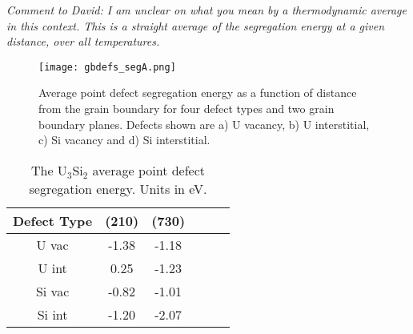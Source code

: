 \documentclass[review]{elsarticle}
\begin{document}
\begin{comment}

\begin{figure}[h]
 \centering
 \texttt{[image: defectsB730.png]} 
 \caption{Point defect segregation energy as a function of distance from the (730) symmetric tilt grain boundary. Each defect is investigated at four different temperatures. Defects shown are a) U vacancy, b) U interstitial, c) Si vacancy and d) Si interstitial. }
 \label{fig:defects730}
\end{figure}

\begin{figure}[h]
 \centering
 \texttt{[image: defectsB210.png]} 
 \caption{Point defect segregation energy as a function of distance from the grain boundary. Each defect is investigated at four different temperatures. Defects shown are U vacancy, U interstitial, Si vacancy and Si interstitial. }
 \label{fig:defects210}
\end{figure}

\end{comment}

\textit{\color{blue}Comment to David: I am unclear on what you mean by a thermodynamic average in this context. This is a straight average of the segregation energy at a given distance, over all temperatures.} 

\begin{figure}[h]
 \centering
 \texttt{[image: gbdefs\_segA.png]} 
 \caption{Average point defect segregation energy as a function of distance from the grain boundary for four defect types and two grain boundary planes. Defects shown are a) U vacancy, b) U interstitial, c) Si vacancy and d) Si interstitial. }
 \label{fig:seg}
\end{figure}

\FloatBarrier



\begin{table}[h]
\caption{The U$_{3}$Si$_{2}$ average point defect segregation energy. Units in eV.} \label{tab:seg}
\begin{center}
\begin{tabular}{|c|c|c|c|c|c|}
	\hline
	Defect Type & (210) & (730)\\
	 \hline
	 U vac & -1.38 & -1.18	 \\
	 U int & 0.25 & -1.23 \\
	 Si vac & -0.82 & -1.01	 \\
	 Si int & -1.20 & -2.07 \\
	 \hline
\end{tabular}
\end{center}
\label{default}
\end{table}
\end{document}

